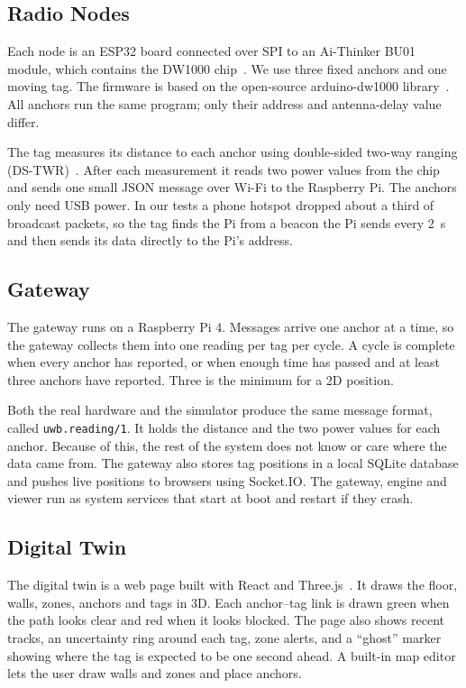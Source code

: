 \documentclass[conference]{IEEEtran}
\begin{document}
\subsection{Radio Nodes}
Each node is an ESP32 board connected over SPI to an Ai-Thinker BU01
module, which contains the DW1000 chip~\cite{bu01spec,esp32datasheet}. We
use three fixed anchors and one moving tag. The firmware is based on the
open-source arduino-dw1000 library~\cite{thotro2015arduino}. All anchors run
the same program; only their address and antenna-delay value differ.

The tag measures its distance to each anchor using double-sided two-way
ranging (DS-TWR)~\cite{neirynck2016alternative}. After each measurement it
reads two power values from the chip and sends one small JSON message over
Wi-Fi to the Raspberry Pi. The anchors only need USB power. In our tests a
phone hotspot dropped about a third of broadcast packets, so the tag finds
the Pi from a beacon the Pi sends every 2~s and then sends its data
directly to the Pi's address.

\subsection{Gateway}
The gateway runs on a Raspberry Pi 4. Messages arrive one anchor at a time,
so the gateway collects them into one reading per tag per cycle. A cycle
is complete when every anchor has reported, or when enough time has passed
and at least three anchors have reported. Three is the minimum for a 2D
position.

Both the real hardware and the simulator produce the same message format,
called \texttt{uwb.reading/1}. It holds the distance and the two power
values for each anchor. Because of this, the rest of the system does not
know or care where the data came from. The gateway also stores tag
positions in a local SQLite database and pushes live positions to browsers
using Socket.IO. The gateway, engine and viewer run as system services that
start at boot and restart if they crash.

\subsection{Digital Twin}
The digital twin is a web page built with React and
Three.js~\cite{grieves2017digital}. It draws the floor, walls, zones,
anchors and tags in 3D. Each anchor--tag link is drawn green when the path
looks clear and red when it looks blocked. The page also shows recent
tracks, an uncertainty ring around each tag, zone alerts, and a ``ghost''
marker showing where the tag is expected to be one second ahead. A built-in
map editor lets the user draw walls and zones and place anchors.
\end{document}
